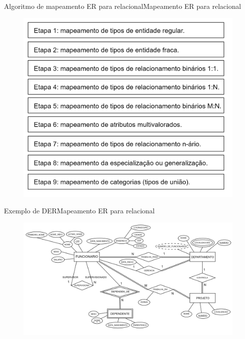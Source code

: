 \documentclass[t]{beamer}
\begin{document}

\begin{ftst}{Algoritmo de mapeamento ER para relacional}{Mapeamento ER para relacional}
\begin{figure}
    \centering
    \includegraphics[scale=0.12]{Figuras/03_01.png}
\end{figure}
\end{ftst}


\begin{ftst}{Exemplo de DER}{Mapeamento ER para relacional}
\begin{figure}
    \centering
    \includegraphics[scale=0.11]{Figuras/03_02.png}
\end{figure}
\end{ftst}
\end{document}
